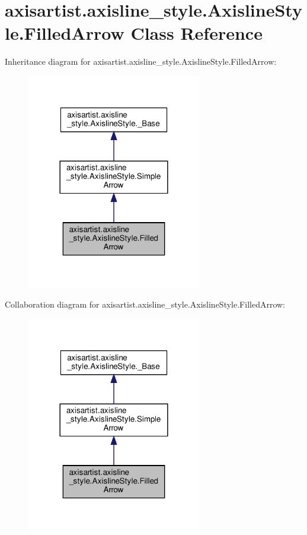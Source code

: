 \hypertarget{classaxisartist_1_1axisline__style_1_1AxislineStyle_1_1FilledArrow}{}\section{axisartist.\+axisline\+\_\+style.\+Axisline\+Style.\+Filled\+Arrow Class Reference}
\label{classaxisartist_1_1axisline__style_1_1AxislineStyle_1_1FilledArrow}


Inheritance diagram for axisartist.\+axisline\+\_\+style.\+Axisline\+Style.\+Filled\+Arrow\+:
\nopagebreak
\begin{figure}[H]
\begin{center}
\leavevmode
\includegraphics[width=216pt]{classaxisartist_1_1axisline__style_1_1AxislineStyle_1_1FilledArrow__inherit__graph}
\end{center}
\end{figure}


Collaboration diagram for axisartist.\+axisline\+\_\+style.\+Axisline\+Style.\+Filled\+Arrow\+:
\nopagebreak
\begin{figure}[H]
\begin{center}
\leavevmode
\includegraphics[width=216pt]{classaxisartist_1_1axisline__style_1_1AxislineStyle_1_1FilledArrow__coll__graph}
\end{center}
\end{figure}
